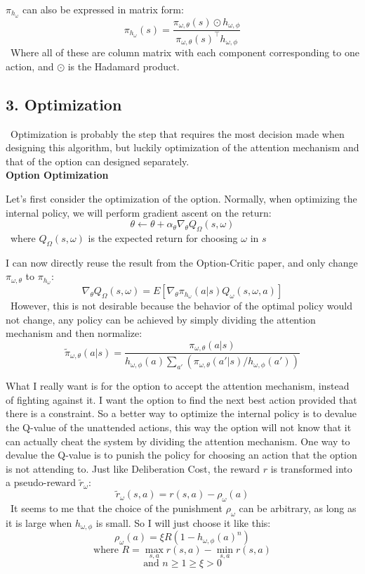 \documentclass{article}
\begin{document}
	\quad $\pi_{h_\omega}$ can also be expressed in matrix form: $$\pi_{h_\omega}(s) = \frac{\pi_{\omega,\theta}(s)\odot h_{\omega, \phi}}{\pi_{\omega,\theta}(s)^\intercal h_{\omega, \phi}}$$ \qquad \ Where all of these are column matrix with each component corresponding to one action, and $\odot$ is the Hadamard product.
	\subsection*{3. Optimization}
	\qquad \ Optimization is probably the step that requires the most decision made when designing this algorithm, but luckily optimization of the attention mechanism and that of the option can designed separately.\vspace{0.2in}\\
	{\bfseries Option Optimization}\vspace{0.05in}
	
	\quad Let's first consider the optimization of the option. Normally, when optimizing the internal policy, we will perform gradient ascent on the return: $$\theta \leftarrow \theta + \alpha_\theta \nabla_\theta Q_\Omega(s,\omega)$$ \qquad \ where $Q_\Omega(s,\omega)$ is the expected return for choosing $\omega$ in $s$
	
	\quad I can now directly reuse the result from the Option-Critic paper, and only change $\pi_{\omega,\theta}$ to $\pi_{h_\omega}$: $$\nabla_\theta Q_\Omega(s,\omega) = E[\nabla_\theta \pi_{h_\omega}(a|s) Q_\omega(s,\omega,a)]$$
	\qquad \ However, this is not desirable because the behavior of the optimal policy would not change, any policy can be achieved by simply dividing the attention mechanism and then normalize: $$\widetilde{\pi}_{\omega,\theta}(a|s) = \frac{\pi_{\omega,\theta}(a|s) }{h_{\omega, \phi}(a)\sum_{a'} (\pi_{\omega,\theta}(a'|s)/h_{\omega, \phi}(a'))}$$
	
	\quad What I really want is for the option to accept the attention mechanism, instead of fighting against it. I want the option to find the next best action provided that there is a constraint. So a better way to optimize the internal policy is to devalue the Q-value of the unattended actions, this way the option will not know that it can actually cheat the system by dividing the attention mechanism. One way to devalue the Q-value is to punish the policy for choosing an action that the option is not attending to. Just like Deliberation Cost, the reward $r$ is transformed into a pseudo-reward $\widetilde{r}_\omega$: $$\widetilde{r}_\omega(s,a)=r(s,a)-\rho_\omega(a)$$ \qquad \ It seems to me that the choice of the punishment $\rho_\omega$ can be arbitrary, as long as it is large when $h_{\omega,\phi}$ is small. So I will just choose it like this:$$\rho_\omega(a)=\xi R (1-h_{\omega,\phi}(a)^n)$$ $$\textrm{where } R=\max_{s,a}r(s,a)-\min_{s,a}r(s,a)$$ $$ \textrm{and } n\geq 1\geq\xi>0$$
	
\end{document}
